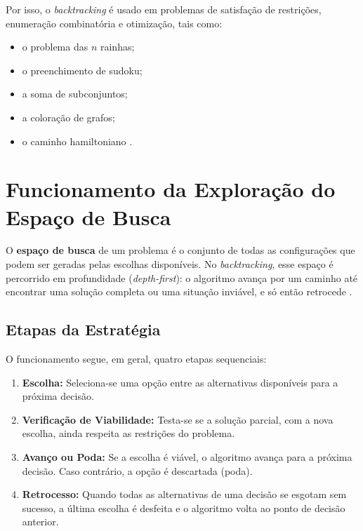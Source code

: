 Por isso, o \textit{backtracking} é usado em problemas de satisfação de restrições, enumeração combinatória e otimização, tais como:

\begin{itemize}
    \item o problema das $n$ rainhas;
    \item o preenchimento de sudoku;
    \item a soma de subconjuntos;
    \item a coloração de grafos;
    \item o caminho hamiltoniano \cite{russell2013, cormen2012}.
\end{itemize}

\section{Funcionamento da Exploração do Espaço de Busca}

O \textbf{espaço de busca} de um problema é o conjunto de todas as configurações que podem ser geradas pelas escolhas disponíveis. No \textit{backtracking}, esse espaço é percorrido em profundidade (\textit{depth-first}): o algoritmo avança por um caminho até encontrar uma solução completa ou uma situação inviável, e só então retrocede \cite{levitin2011}.

\subsection{Etapas da Estratégia}

O funcionamento segue, em geral, quatro etapas sequenciais:

\begin{enumerate}
    \item \textbf{Escolha:} Seleciona-se uma opção entre as alternativas disponíveis para a próxima decisão.
    \item \textbf{Verificação de Viabilidade:} Testa-se se a solução parcial, com a nova escolha, ainda respeita as restrições do problema.
    \item \textbf{Avanço ou Poda:} Se a escolha é viável, o algoritmo avança para a próxima decisão. Caso contrário, a opção é descartada (poda).
    \item \textbf{Retrocesso:} Quando todas as alternativas de uma decisão se esgotam sem sucesso, a última escolha é desfeita e o algoritmo volta ao ponto de decisão anterior.
\end{enumerate}


